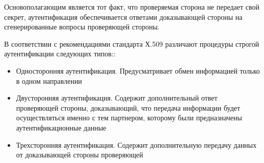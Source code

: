 Основополагающим является тот факт, что проверяемая сторона не передает свой секрет, аутентификация
обеспечивается ответами доказывающей стороны на сгенерированные вопросы проверяющей стороны.

В соответствии с рекомендациями стандарта Х.509 различают процедуры строгой аутентификации
следующих типов\cite{crypto-methods}::
\begin{itemize}
    \item Односторонняя аутентификация. Предусматривает обмен информацией только в одном направлении
    \item Двусторонняя аутентификация. Содержит дополнительный ответ проверяющей стороны,
        доказывающий, что передача информации будет осуществляться именно с тем партнером, которому
        были предназначены аутентификационные данные
    \item Трехсторонняя аутентификация. Содержит дополнительную передачу данных от доказывающей
        стороны проверяющей
\end{itemize}

